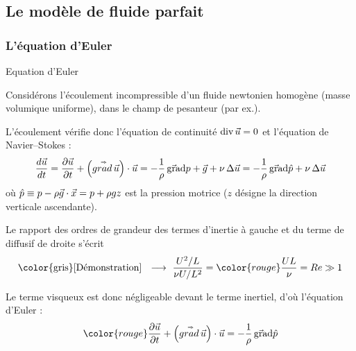 \subsection{Le modèle de fluide parfait}

\subsubsection{L'équation d'Euler}
\begin{frame}{Equation d'Euler}

\small

Considérons l'écoulement incompressible d'un fluide newtonien homogène (masse volumique uniforme), dans le champ de pesanteur (par ex.).

\pause 

\medskip

L'écoulement vérifie donc l'équation de continuité 
$\mbox{\rm div}\, \vec{u} = 0$ et l'équation de Navier--Stokes :
\begin{equation}
  \displaystyle \frac{d \vec{u}}{dt} = \displaystyle \frac{\partial \vec{u}}{\partial t}  + \left( \accentset{\Rightarrow}{grad} \, \vec{u} \right) \cdot \vec{u}
  =
  - \frac{1}{\rho} \, \vec{\mbox{\rm gra}}\mbox{\rm d} p + \vec{g} 
  + \nu \, \Delta \vec{u}
  =
  - \frac{1}{\rho} \, \vec{\mbox{\rm gra}}\mbox{\rm d} \hat{p} 
  + \nu \, \Delta \vec{u}  
\end{equation}
o\`u $\hat{p} \equiv p - \rho \vec{g} \cdot \vec{x} = p + \rho g z$ 
est la pression motrice
($z$ désigne la direction verticale ascendante).

\bigskip

\pause

Le rapport des ordres de grandeur des termes d'inertie à gauche et du terme de diffusif de droite s'écrit
\begin{equation}
  \mbox{\color{gris} [Démonstration] \; $\longrightarrow$ \;}
  \frac{U^2/L}{\nu U/L^2} = \color{rouge}\frac{UL}{\nu} = Re \gg 1
\end{equation}

\pause
\medskip

Le terme visqueux est donc négligeable devant le terme inertiel,
d'o\`u l'\textcolor{vert}{équation d'Euler} :
\begin{equation}
	\color{rouge} 
  \dpdt{\myvec{u}} + \left( \mytensor{grad} \, \myvec{u} \right) \cdot \myvec{u}
  =
  - \frac{1}{\rho} \, \gradient{\hat{p}}
\end{equation}

\vspace{20mm}

\end{frame}

